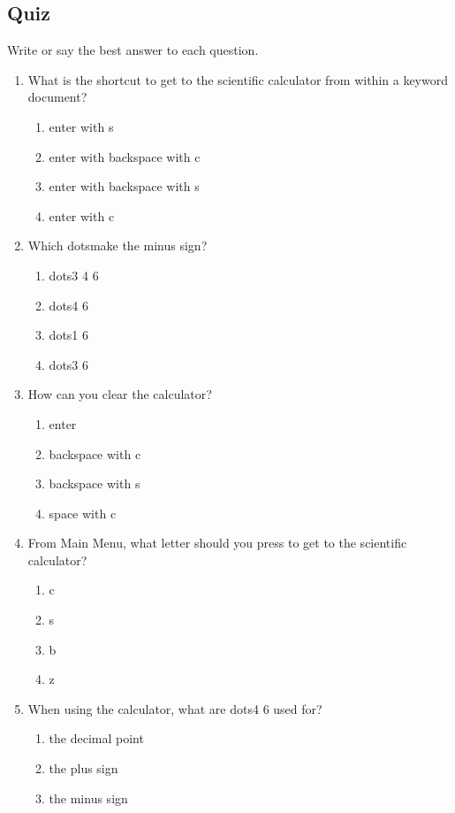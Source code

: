 \documentclass[10pt,letterpaper,twoside]{report}
\begin{document}
{{{\subsection{Quiz}
Write or say the best answer to each question.
\begin{enumerate}
	\item What is the shortcut to get to the scientific calculator from within a keyword document?
	      \begin{enumerate}
		      \item enter with s
		      \item enter with backspace with c
		      \item enter with backspace with s
		      \item enter with c
	      \end{enumerate}
	\item Which dotsmake the minus sign?
	      \begin{enumerate}
		      \item dots3 4 6
		      \item dots4 6
		      \item dots1 6
		      \item dots3 6
	      \end{enumerate}
	\item How can you clear the calculator?
	      \begin{enumerate}
		      \item enter
		      \item backspace with c
		      \item backspace with s
		      \item space with c
	      \end{enumerate}
	\item From Main Menu, what letter should you press to get to the scientific calculator?
	      \begin{enumerate}
		      \item c
		      \item s
		      \item b
		      \item z
	      \end{enumerate}
	\item When using the calculator, what are dots4 6 used for?
	      \begin{enumerate}
		      \item the decimal point
		      \item the plus sign
		      \item the minus sign

\end{enumerate}
\end{enumerate}}}}
\end{document}
